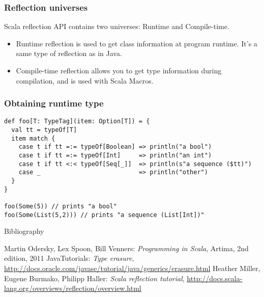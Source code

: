 \documentclass{beamer}
\begin{document}
\begin{frame}[fragile]
\frametitle{Reflection universes}
Scala reflection API contains two universes: Runtime and Compile-time.

\begin{itemize}
\item Runtime reflection is used to get class information at program runtime. It's a same type of reflection as in Java.
\item Compile-time reflection allows you to get type information during compilation, and is used with Scala Macros.
\end{itemize}
\end{frame}

\begin{frame}[fragile]
\frametitle{Obtaining runtime type}
\begin{lstlisting}
def foo[T: TypeTag](item: Option[T]) = {
  val tt = typeOf[T]
  item match {
    case t if tt =:= typeOf[Boolean] => println("a bool")
    case t if tt =:= typeOf[Int]     => println("an int")
    case t if tt <:< typeOf[Seq[_]]  => println(s"a sequence ($tt)")
    case _                           => println("other")
  }
}

foo(Some(5)) // prints "a bool"
foo(Some(List(5,2))) // prints "a sequence (List[Int])"
\end{lstlisting}
\end{frame}

\begin{frame}{Bibliography}
\begin{thebibliography}{00}
Martin Odersky, Lex Spoon, Bill Venners:
\emph{Programming in Scala},
Artima, 2nd edition, 2011
Java\texttrademark  Tutorials: \emph{Type erasure}, \url{http://docs.oracle.com/javase/tutorial/java/generics/erasure.html}
Heather Miller, Eugene Burmako, Philipp Haller: \emph{Scala reflection tutorial}, \url{http://docs.scala-lang.org/overviews/reflection/overview.html}
\end{thebibliography}
\end{frame}


\end{document}
